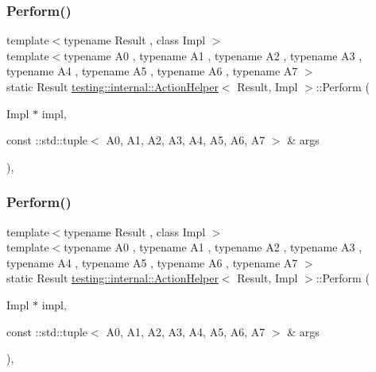 \mbox{\label{classtesting_1_1internal_1_1_action_helper_a25b72af29e06aa5995a1f6c35d2919f3}} 
\subsubsection{\texorpdfstring{Perform()}{Perform()}\hspace{0.1cm}{\footnotesize\ttfamily [17/33]}}
{\footnotesize\ttfamily template$<$typename Result , class Impl $>$ \\
template$<$typename A0 , typename A1 , typename A2 , typename A3 , typename A4 , typename A5 , typename A6 , typename A7 $>$ \\
static Result \mbox{\hyperlink{classtesting_1_1internal_1_1_action_helper}{testing\+::internal\+::\+Action\+Helper}}$<$ Result, Impl $>$\+::Perform (\begin{DoxyParamCaption}\item[{Impl $\ast$}]{impl,  }\item[{const \+::std\+::tuple$<$ A0, A1, A2, A3, A4, A5, A6, A7 $>$ \&}]{args }\end{DoxyParamCaption})\hspace{0.3cm}{\ttfamily [inline]}, {\ttfamily [static]}}

\mbox{\label{classtesting_1_1internal_1_1_action_helper_a25b72af29e06aa5995a1f6c35d2919f3}} 
\subsubsection{\texorpdfstring{Perform()}{Perform()}\hspace{0.1cm}{\footnotesize\ttfamily [18/33]}}
{\footnotesize\ttfamily template$<$typename Result , class Impl $>$ \\
template$<$typename A0 , typename A1 , typename A2 , typename A3 , typename A4 , typename A5 , typename A6 , typename A7 $>$ \\
static Result \mbox{\hyperlink{classtesting_1_1internal_1_1_action_helper}{testing\+::internal\+::\+Action\+Helper}}$<$ Result, Impl $>$\+::Perform (\begin{DoxyParamCaption}\item[{Impl $\ast$}]{impl,  }\item[{const \+::std\+::tuple$<$ A0, A1, A2, A3, A4, A5, A6, A7 $>$ \&}]{args }\end{DoxyParamCaption})\hspace{0.3cm}{\ttfamily [inline]}, {\ttfamily [static]}}

